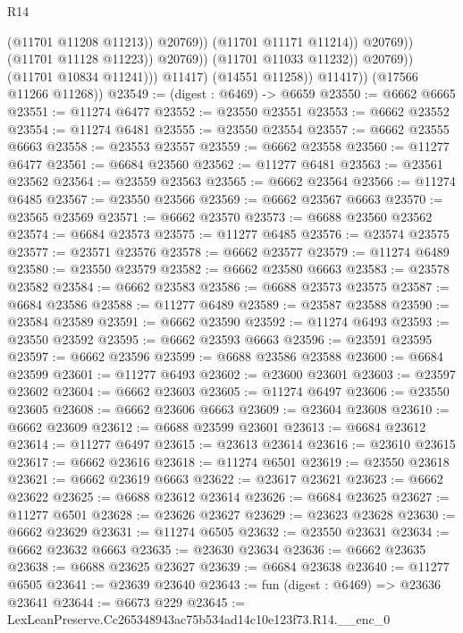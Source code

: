 \begin{lexlean}{R14}
\begin{coremodule}
                                          (@11701 @11208 @11213))
                                        @20769))
                                    (@11701 @11171 @11214))
                                  @20769))
                              (@11701 @11128 @11223))
                            @20769))
                        (@11701 @11033 @11232))
                      @20769))
                  (@11701 @10834 @11241)))
              @11417)
            (@14551 @11258))
          @11417))
      (@17566 @11266 @11268))
@23549 := (digest : @6469) -> @6659
@23550 := @6662 @6665
@23551 := @11274 @6477
@23552 := @23550 @23551
@23553 := @6662 @23552
@23554 := @11274 @6481
@23555 := @23550 @23554
@23557 := @6662 @23555 @6663
@23558 := @23553 @23557
@23559 := @6662 @23558
@23560 := @11277 @6477
@23561 := @6684 @23560
@23562 := @11277 @6481
@23563 := @23561 @23562
@23564 := @23559 @23563
@23565 := @6662 @23564
@23566 := @11274 @6485
@23567 := @23550 @23566
@23569 := @6662 @23567 @6663
@23570 := @23565 @23569
@23571 := @6662 @23570
@23573 := @6688 @23560 @23562
@23574 := @6684 @23573
@23575 := @11277 @6485
@23576 := @23574 @23575
@23577 := @23571 @23576
@23578 := @6662 @23577
@23579 := @11274 @6489
@23580 := @23550 @23579
@23582 := @6662 @23580 @6663
@23583 := @23578 @23582
@23584 := @6662 @23583
@23586 := @6688 @23573 @23575
@23587 := @6684 @23586
@23588 := @11277 @6489
@23589 := @23587 @23588
@23590 := @23584 @23589
@23591 := @6662 @23590
@23592 := @11274 @6493
@23593 := @23550 @23592
@23595 := @6662 @23593 @6663
@23596 := @23591 @23595
@23597 := @6662 @23596
@23599 := @6688 @23586 @23588
@23600 := @6684 @23599
@23601 := @11277 @6493
@23602 := @23600 @23601
@23603 := @23597 @23602
@23604 := @6662 @23603
@23605 := @11274 @6497
@23606 := @23550 @23605
@23608 := @6662 @23606 @6663
@23609 := @23604 @23608
@23610 := @6662 @23609
@23612 := @6688 @23599 @23601
@23613 := @6684 @23612
@23614 := @11277 @6497
@23615 := @23613 @23614
@23616 := @23610 @23615
@23617 := @6662 @23616
@23618 := @11274 @6501
@23619 := @23550 @23618
@23621 := @6662 @23619 @6663
@23622 := @23617 @23621
@23623 := @6662 @23622
@23625 := @6688 @23612 @23614
@23626 := @6684 @23625
@23627 := @11277 @6501
@23628 := @23626 @23627
@23629 := @23623 @23628
@23630 := @6662 @23629
@23631 := @11274 @6505
@23632 := @23550 @23631
@23634 := @6662 @23632 @6663
@23635 := @23630 @23634
@23636 := @6662 @23635
@23638 := @6688 @23625 @23627
@23639 := @6684 @23638
@23640 := @11277 @6505
@23641 := @23639 @23640
@23643 := fun (digest : @6469) => @23636 @23641
@23644 := @6673 @229
@23645 := LexLeanPreserve.Cc265348943ac75b534ad14c10e123f73.R14.__enc_0

\end{coremodule}
\end{lexlean}

